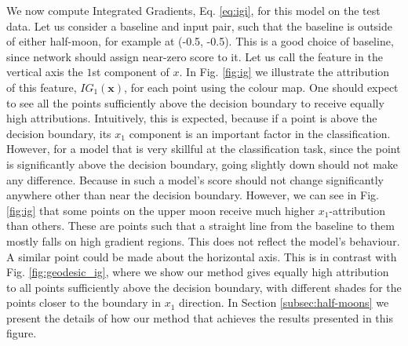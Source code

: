 We now compute Integrated Gradients, Eq. \ref{eq:igi}, for this model on the test data. Let us consider a baseline and input pair, such that the baseline is outside of either half-moon, for example at (-0.5, -0.5). This is a good choice of baseline, since network should assign near-zero score to it. Let us call the feature in the vertical axis the $1$st component of $x$. In Fig. \ref{fig:ig} we illustrate the attribution of this feature, $IG_1(\textbf{x})$, for each point using the colour map. One should expect to see all the points sufficiently above the decision boundary to receive equally high attributions. Intuitively, this is expected, because if a point is above the decision boundary, its $x_1$ component is an important factor in the classification. However, for a model that is very skillful at the classification task, since the point is significantly above the decision boundary, going slightly down should not make any difference. Because in such a model's score should not change significantly anywhere other than near the decision boundary. However, we can see in Fig. \ref{fig:ig} that some points on the upper moon receive much higher $x_1$-attribution than others. These are points such that a straight line from the baseline to them mostly falls on high gradient regions. This does not reflect the model's behaviour. A similar point could be made about the horizontal axis. This is in contrast with Fig. \ref{fig:geodesic_ig}, where we show our method gives equally high attribution to all points sufficiently above the decision boundary, with different shades for the points closer to the boundary in $x_1$ direction. In Section \ref{subsec:half-moons} we present the details of how our method that achieves the results presented in this figure.

